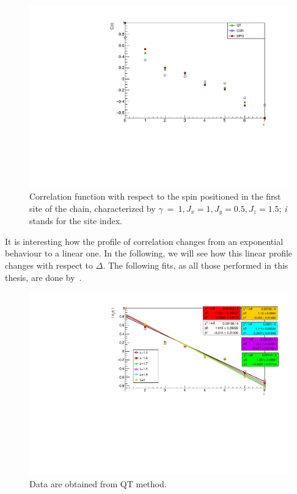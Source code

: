 \begin{figure}[H]
    \centering
    \includegraphics[scale=0.7]{Figures/8sites_comparison/CorrFunc1_8s_J10515.pdf}
    \caption{Correlation function with respect to the spin positioned in the first site of the chain, characterized by $\gamma~=~1, J_x=1, J_y=0.5, J_z=1.5$; \emph{i} stands for the site index.}
    \label{fig:my_label}
\end{figure}

It is interesting how the profile of correlation changes from an exponential behaviour to a linear one. In the following, we will see how this linear profile changes with respect to $\Delta$. The following fits, as all those performed in this thesis, are done by~\cite{root_cern}.

\begin{figure}[H]
    \centering
    \includegraphics[scale=0.8]{Figures/8sites_comparison/FIT8sCorrFunc1_MPO_over15.pdf}
    \caption{Data are obtained from QT method.}
    \label{fig:my_label}
\end{figure}

